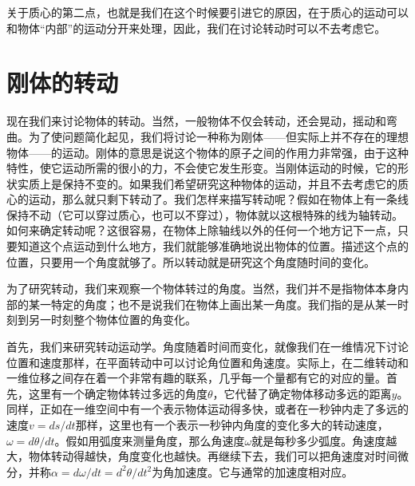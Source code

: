 关于质心的第二点，也就是我们在这个时候要引进它的原因，在于质心的运动可以和物体“内部”的运动分开来处理，因此，我们在讨论转动时可以不去考虑它。

\section{刚体的转动}

现在我们来讨论物体的转动。当然，一般物体不仅会转动，还会晃动，摇动和弯曲。为了使问题简化起见，我们将讨论一种称为刚体——但实际上并不存在的理想物体——的运动。刚体的意思是说这个物体的原子之间的作用力非常强，由于这种特性，使它运动所需的很小的力，不会使它发生形变。当刚体运动的时候，它的形状实质上是保持不变的。如果我们希望研究这种物体的运动，并且不去考虑它的质心的运动，那么就只剩下转动了。我们怎样来描写转动呢？假如在物体上有一条线保持不动（它可以穿过质心，也可以不穿过），物体就以这根特殊的线为轴转动。如何来确定转动呢？这很容易，在物体上除轴线以外的任何一个地方记下一点，只要知道这个点运动到什么地方，我们就能够准确地说出物体的位置。描述这个点的位置，只要用一个角度就够了。所以转动就是研究这个角度随时间的变化。

为了研究转动，我们来观察一个物体转过的角度。当然，我们并不是指物体本身内部的某一特定的角度；也不是说我们在物体上画出某一角度。我们指的是从某一时刻到另一时刻整个物体位置的角变化。

首先，我们来研究转动运动学。角度随着时间而变化，就像我们在一维情况下讨论位置和速度那样，在平面转动中可以讨论角位置和角速度。实际上，在二维转动和一维位移之间存在着一个非常有趣的联系，几乎每一个量都有它的对应的量。首先，这里有一个确定物体转过多远的角度$\theta$，它代替了确定物体移动多远的距离$y$。同样，正如在一维空间中有一个表示物体运动得多快，或者在一秒钟内走了多远的速度$v=ds/dt$那样，这里也有一个表示一秒钟内角度的变化多大的转动速度，$\omega=d\theta/dt$。假如用弧度来测量角度，那么角速度$\omega$就是每秒多少弧度。角速度越大，物体转动得越快，角度变化也越快。再继续下去，我们可以把角速度对时间微分，并称$\alpha=d\omega/dt=d^2\theta/dt^2$为角加速度。它与通常的加速度相对应。

